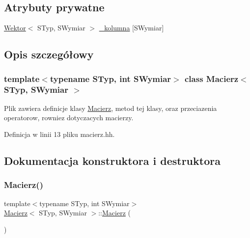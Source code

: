 \subsection*{Atrybuty prywatne}
\begin{DoxyCompactItemize}
\item 
\mbox{\hyperlink{class_wektor}{Wektor}}$<$ S\+Typ, S\+Wymiar $>$ \mbox{\hyperlink{class_macierz_a6e6438989920542355819ef7ba3e7066}{\+\_\+kolumna}} \mbox{[}S\+Wymiar\mbox{]}
\end{DoxyCompactItemize}


\subsection{Opis szczegółowy}
\subsubsection*{template$<$typename S\+Typ, int S\+Wymiar$>$\newline
class Macierz$<$ S\+Typ, S\+Wymiar $>$}

Plik zawiera definicje klasy \mbox{\hyperlink{class_macierz}{Macierz}}, metod tej klasy, oraz przeciazenia operatorow, rowniez dotyczacych macierzy. 

Definicja w linii 13 pliku macierz.\+hh.



\subsection{Dokumentacja konstruktora i destruktora}
\mbox{\label{class_macierz_a7e46fe9d8c2c8a6c3b4d3b7ecd800de6}} 
\subsubsection{\texorpdfstring{Macierz()}{Macierz()}\hspace{0.1cm}{\footnotesize\ttfamily [1/2]}}
{\footnotesize\ttfamily template$<$typename S\+Typ, int S\+Wymiar$>$ \\
\mbox{\hyperlink{class_macierz}{Macierz}}$<$ S\+Typ, S\+Wymiar $>$\+::\mbox{\hyperlink{class_macierz}{Macierz}} (\begin{DoxyParamCaption}{ }\end{DoxyParamCaption})\hspace{0.3cm}{\ttfamily [inline]}}

